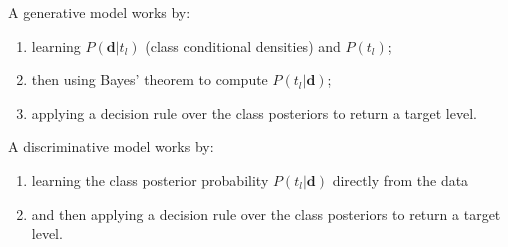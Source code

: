 \documentclass[xcolor={table}]{beamer}
\begin{document}
\begin{frame}
	\begin{block}{A generative model works by:}
	\begin{enumerate}
\item learning $P(\mathbf{d}| t_l)$ (class conditional densities) and  $P(t_l)$; 
\item then using Bayes' theorem to compute $P(t_l| \mathbf{d})$; 
\item applying a decision rule over the class posteriors to return a target level. 
\end{enumerate}
	\end{block}
\end{frame}

\begin{frame}
	\begin{block}{A discriminative model works by:}
\begin{enumerate}
\item learning the class posterior probability $P(t_l|\mathbf{d})$ directly from the data
\item and then applying a decision rule over the class posteriors to return a target level.
\end{enumerate}
	\end{block}
\end{frame}
\end{document}
